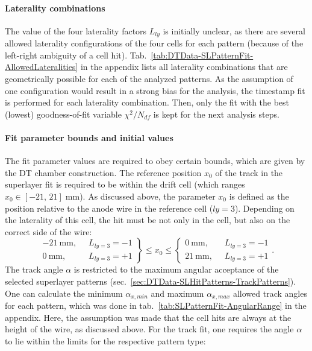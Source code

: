 \paragraph{Laterality combinations}
The value of the four laterality factors $L_{ly}$ is initially unclear, as there are several allowed laterality configurations of the four cells for each pattern (because of the left-right ambiguity of a cell hit). Tab.\ \ref{tab:DTData-SLPatternFit-AllowedLateralities} in the appendix lists all laterality combinations that are geometrically possible for each of the analyzed patterns. As the assumption of one configuration would result in a strong bias for the analysis, the timestamp fit is performed for each laterality combination. Then, only the fit with the best (lowest) goodness-of-fit variable $\chi^2/N_{df}$ is kept for the next analysis steps.
\paragraph{Fit parameter bounds and initial values}
The fit parameter values are required to obey certain bounds, which are given by the \ac{DT} chamber construction. The reference position $x_0$ of the track in the superlayer fit is required to be within the drift cell (which ranges $x_0 \in [-21,\,21]\;\si{\milli\meter}$). As discussed above, the parameter $x_0$ is defined as the position relative to the anode wire in the reference cell ($ly=3$). Depending on the laterality of this cell, the hit must be not only in the cell, but also on the correct side of the wire:
\begin{equation}
    \left.\begin{aligned}
        \SI{-21}{\milli\meter},\;\; & L_{ly=3}=-1 \\
        \SI{0}{\milli\meter},\;\; & L_{ly=3}=+1
    \end{aligned}\right\}
    \leq x_0 \leq
    \left\{\begin{aligned}
        \SI{0}{\milli\meter},\;\; & L_{ly=3}=-1 \\
        \SI{21}{\milli\meter},\;\; & L_{ly=3}=+1
    \end{aligned}\right. .
    \label{eq:SLPatternFit-x0-bounds}
\end{equation}
The track angle $\alpha$ is restricted to the maximum angular acceptance of the selected superlayer patterns (sec.\ \ref{sec:DTData-SLHitPatterns-TrackPatterns}). One can calculate the minimum $ \alpha_{x,min}$ and maximum $\alpha_{x,max}$ allowed track angles for each pattern, which was done in tab.\ \ref{tab:SLPatternFit-AngularRange} in the appendix. Here, the assumption was made that the cell hits are always at the height of the wire, as discussed above. For the track fit, one requires the angle $\alpha$ to lie within the limits for the respective pattern type:
